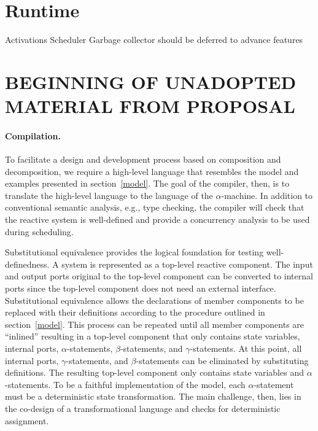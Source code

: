 \section{Runtime}
Activations
Scheduler
Garbage collector should be deferred to advance features



\section{BEGINNING OF UNADOPTED MATERIAL FROM PROPOSAL}

\paragraph{Compilation.}
To facilitate a design and development process based on composition and decomposition, we require a high-level language that resembles the model and examples presented in section~\ref{model}.
The goal of the compiler, then, is to translate the high-level language to the language of the $\alpha$-machine.
In addition to conventional semantic analysis, e.g., type checking, the compiler will check that the reactive system is well-defined and provide a concurrency analysis to be used during scheduling.

Substitutional equivalence provides the logical foundation for testing well-definedness.
A system is represented as a top-level reactive component.
The input and output ports original to the top-level component can be converted to internal ports since the top-level component does not need an external interface.
Substitutional equivalence allows the declarations of member components to be replaced with their definitions according to the procedure outlined in section~\ref{model}.
This process can be repeated until all member components are ``inlined'' resulting in a top-level component that only contains state variables, internal ports, $\alpha$-statements, $\beta$-statements, and $\gamma$-statements.
At this point, all internal ports, $\gamma$-statements, and $\beta$-statements can be eliminated by substituting definitions.
The resulting top-level component only contains state variables and $\alpha$-statements.
To be a faithful implementation of the model, each $\alpha$-statement must be a deterministic state transformation.
The main challenge, then, lies in the co-design of a transformational language and checks for deterministic assignment.


